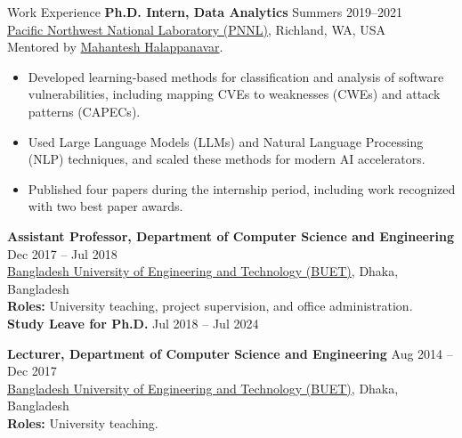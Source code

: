\documentclass{resume} %
\begin{document}
\begin{rSection}{Work Experience}
\textbf{Ph.D. Intern, Data Analytics} \hfill Summers 2019--2021\\
\href{https://www.pnnl.gov/}{Pacific Northwest National Laboratory (PNNL)}, Richland, WA, USA\\
Mentored by \href{https://www.pnnl.gov/people/mahantesh-halappanavar}{Mahantesh Halappanavar}.\\
\begin{itemize}
    \item Developed learning-based methods for classification and analysis of software vulnerabilities, including mapping CVEs to weaknesses (CWEs) and attack patterns (CAPECs).
    \item Used Large Language Models (LLMs) and Natural Language Processing (NLP) techniques, and scaled these methods for modern AI accelerators.
    \item Published four papers during the internship period, including work recognized with two best paper awards.
\end{itemize} 

\textbf{Assistant Professor, Department of Computer Science and Engineering} \hfill Dec 2017 -- Jul 2018\\
\href{https://www.buet.ac.bd/web/}{Bangladesh University of Engineering and Technology (BUET)}, Dhaka, Bangladesh\\
\textbf{Roles:} University teaching, project supervision, and office administration.\\
\textbf{Study Leave for Ph.D.} Jul 2018 -- Jul 2024

\textbf{Lecturer, Department of Computer Science and Engineering} \hfill Aug 2014 -- Dec 2017\\
\href{https://www.buet.ac.bd/web/}{Bangladesh University of Engineering and Technology (BUET)}, Dhaka, Bangladesh\\
\textbf{Roles:} University teaching.

\end{rSection} 
\end{document}
